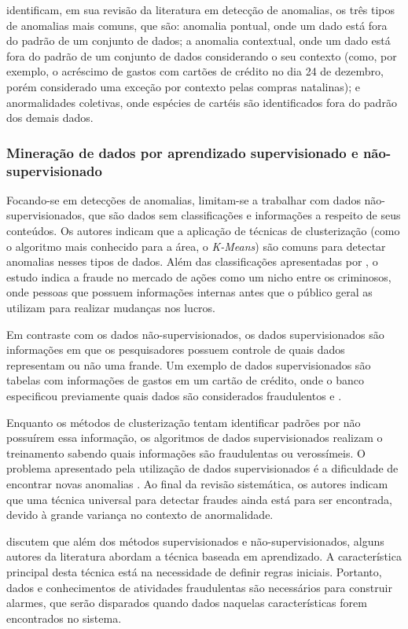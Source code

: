 \documentclass[smallextended]{svjour3}
\begin{document}
\cite{Ahmed2015} identificam, em sua revisão da literatura em detecção de anomalias, os três tipos de anomalias mais comuns, que são: anomalia pontual, onde um dado está fora do padrão de um conjunto de dados; a anomalia contextual, onde um dado está fora do padrão de um conjunto de dados considerando o seu contexto (como, por exemplo, o acréscimo de gastos com cartões de crédito no dia 24 de dezembro, porém considerado uma exceção por contexto pelas compras natalinas); e anormalidades coletivas, onde espécies de cartéis são identificados fora do padrão dos demais dados.

\subsubsection{Mineração de dados por aprendizado supervisionado e não-supervisionado}

Focando-se em detecções de anomalias, \cite{Ahmed2015} limitam-se a trabalhar com dados não-supervisionados, que são dados sem classificações e informações a respeito de seus conteúdos. Os autores indicam que a aplicação de técnicas de clusterização (como o algoritmo mais conhecido para a área, o \emph{K-Means}) são comuns para detectar anomalias nesses tipos de dados. Além das classificações apresentadas por \cite{Abdallah2016}, o estudo indica a fraude no mercado de ações como um nicho entre os criminosos, onde pessoas que possuem informações internas antes que o público geral as utilizam para realizar mudanças nos lucros. 

Em contraste com os dados não-supervisionados, os dados supervisionados são informações em que os pesquisadores possuem controle de quais dados representam ou não uma frande. Um exemplo de dados supervisionados são tabelas com informações de gastos em um cartão de crédito, onde o banco especificou previamente quais dados são considerados fraudulentos \citep{Akoglu2015} e \citep{Branco2016}. 

Enquanto os métodos de clusterização tentam identificar padrões por não possuírem essa informação, os algoritmos de dados supervisionados realizam o treinamento sabendo quais informações são fraudulentas ou verossímeis. O problema apresentado pela utilização de dados supervisionados é a dificuldade de encontrar novas anomalias \citep{Ahmed2015}. Ao final da revisão sistemática, os autores indicam que uma técnica universal para detectar fraudes ainda está para ser encontrada, devido à grande variança no contexto de anormalidade.

\cite{Rebahi2011} discutem que além dos métodos supervisionados e não-supervisionados, alguns autores da literatura abordam a técnica baseada em aprendizado. A característica principal desta técnica está na necessidade de definir regras iniciais. Portanto, dados e conhecimentos de atividades fraudulentas são necessários para construir alarmes, que serão disparados quando dados naquelas características forem encontrados no sistema.
\end{document}

